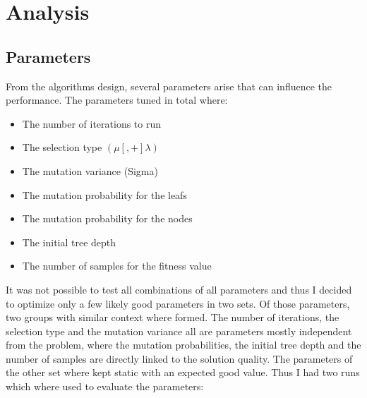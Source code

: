 \documentclass[conference]{IEEEtran}
\begin{document}
\section{Analysis}
\subsection{Parameters}
From the algorithms design, several parameters arise that can influence the performance. The parameters tuned in total where:

\begin{itemize}
\item The number of iterations to run
\item The selection type $(\mu [, +] \lambda)$
\item The mutation variance (Sigma)
\item The mutation probability for the leafs
\item The mutation probability for the nodes
\item The initial tree depth
\item The number of samples for the fitness value
\end{itemize}

It was not possible to test all combinations of all parameters and thus I decided to optimize only a few likely good parameters in two sets.
Of those parameters, two groups with similar context where formed. 
The number of iterations, the selection type and the mutation variance all are parameters mostly independent from the problem, where the mutation probabilities, the initial tree depth  and the number of samples are directly linked to the solution quality. The parameters of the other set where kept static with an expected good value. Thus I had two runs which where used to evaluate the parameters:
\end{document}
